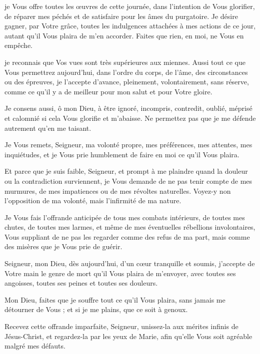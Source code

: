  je Vous offre toutes les œuvres de cette journée, dans l’intention de Vous glorifier, de réparer mes péchés et de satisfaire pour les âmes du purgatoire. Je désire gagner, par Votre grâce, toutes les indulgences attachées à mes actions de ce jour, autant qu’il Vous plaira de m’en accorder. Faites que rien, en moi, ne Vous en empêche.
\culdelampe

 je reconnais que Vos vues sont très supérieures aux miennes. Aussi tout ce que Vous permettrez aujourd’hui, dans l’ordre du corps, de l’âme, des circonstances ou des épreuves, je l’accepte d’avance, pleinement, volontairement, sans réserve, comme ce qu’il y a de meilleur pour mon salut et pour Votre gloire.

Je consens aussi, ô mon Dieu, à être ignoré, incompris, contredit, oublié, méprisé et calomnié si cela Vous glorifie et m’abaisse. Ne permettez pas que je me défende autrement qu’en me taisant.

Je Vous remets, Seigneur, ma volonté propre, mes préférences, mes attentes, mes inquiétudes, et je Vous prie humblement de faire en moi ce qu’il Vous plaira.

Et parce que je suis faible, Seigneur, et prompt à me plaindre quand la douleur ou la contradiction surviennent, je Vous demande de ne pas tenir compte de mes murmures, de mes impatiences ou de mes révoltes naturelles. Voyez-y non l’opposition de ma volonté, mais l’infirmité de ma nature.

Je Vous fais l’offrande anticipée de tous mes combats intérieurs, de toutes mes chutes, de toutes mes larmes, et même de mes éventuelles rébellions involontaires, Vous suppliant de ne pas les regarder comme des refus de ma part, mais comme des misères que je Vous prie de guérir.

Seigneur, mon Dieu, dès aujourd’hui, d’un cœur tranquille et soumis, j’accepte de Votre main le genre de mort qu’il Vous plaira de m’envoyer, avec toutes ses angoisses, toutes ses peines et toutes ses douleurs.

Mon Dieu, faites que je souffre tout ce qu’il Vous plaira, sans jamais me détourner de Vous ; et si je me plains, que ce soit à genoux.

Recevez cette offrande imparfaite, Seigneur, unissez-la aux mérites infinis de Jésus-Christ, et regardez-la par les yeux de Marie, afin qu’elle Vous soit agréable malgré mes défauts.


